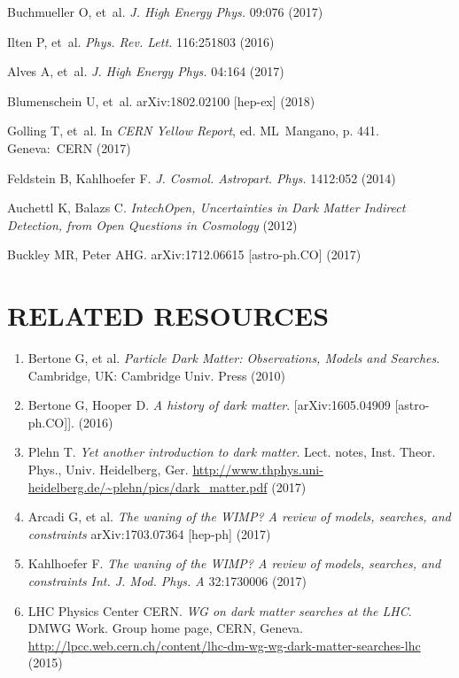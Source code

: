 \documentclass{ar-1col}
\begin{document}
\begin{thebibliography}{175}
Buchmueller O, et~al. \textit{J. High Energy Phys.} 09:076 (2017)

Ilten P, et~al. \textit{Phys. Rev. Lett.} 116:251803 (2016)

Alves A, et~al. \textit{J. High Energy Phys.} 04:164 (2017)

Blumenschein U, et~al. arXiv:1802.02100 [hep-ex] (2018)

Golling T, et~al. In \textit{CERN Yellow Report}, ed. ML\ Mangano, p. 441. Geneva:\ CERN (2017)

Feldstein B, Kahlhoefer F. \textit{J. Cosmol. Astropart. Phys.} 1412:052 (2014)

Auchettl K, Balazs C. \textit{IntechOpen, Uncertainties in Dark Matter Indirect Detection, from Open Questions in Cosmology} (2012)

Buckley MR, Peter AHG. arXiv:1712.06615 [astro-ph.CO] (2017)

\end{thebibliography}

\section*{RELATED RESOURCES}
\begin{enumerate}
\item Bertone G, et al. \textit{Particle Dark Matter: Observations, Models and Searches}. Cambridge, UK: Cambridge Univ. Press (2010)%

\item Bertone G, Hooper D. \textit{A history of dark matter}. [arXiv:1605.04909 [astro-ph.CO]]. (2016)

\item Plehn T. \textit{Yet another introduction to dark matter}. Lect. notes, Inst. Theor. Phys., Univ. Heidelberg, Ger. \url{http://www.thphys.uni-heidelberg.de/~plehn/pics/dark_matter.pdf} (2017)

\item Arcadi G, et al. \textit{The waning of the WIMP? A review of models, searches, and constraints} {arXiv:1703.07364 [hep-ph]} (2017)

\item Kahlhoefer F. \textit{The waning of the WIMP? A review of models, searches, and constraints} \textit{Int. J. Mod. Phys. A} 32:1730006 (2017)

\item {LHC Physics Center CERN.\textit{ WG on dark matter searches at the LHC}. DMWG Work. Group home page, CERN, Geneva.} \url{http://lpcc.web.cern.ch/content/lhc-dm-wg-wg-dark-matter-searches-lhc} (2015)

\end{enumerate}
\end{document}
